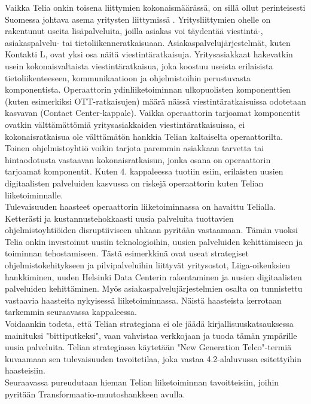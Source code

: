 \documentclass[finnish,12pt,a4paper,pdftex]{article}
\begin{document}
Vaikka Telia onkin toisena liittymien kokonaismäärässä, on sillä ollut perinteisesti Suomessa johtava asema yritysten liittymissä \citep{hesari}. Yritysliittymien ohelle on rakentunut useita lisäpalveluita, joilla asiakas voi täydentää viestintä-, asiakaspalvelu- tai tietoliikenneratkaisuaan. Asiakaspalvelujärjestelmät, kuten Kontakti L, ovat yksi osa näitä viestintäratkaisuja. Yritysasiakkaat hakevatkin usein kokonaisvaltaista viestintäratkaisua, joka koostuu useista erilaisista tietoliikenteeseen, kommunikaatioon ja ohjelmistoihin perustuvasta komponentista. Operaattorin ydinliiketoiminnan ulkopuolisten komponenttien (kuten esimerkiksi OTT-ratkaisujen) määrä näissä viestintäratkaisuissa odotetaan kasvavan (Contact Center-kappale). Vaikka operaattorin tarjoamat komponentit ovatkin välttämättömiä yritysasiakkaiden viestintäratkaisuissa, ei kokonaisratkaisua ole välttämätön hankkia Telian kaltaiselta operaattorilta. Toinen ohjelmistoyhtiö voikin tarjota paremmin asiakkaan tarvetta tai hintaodotusta vastaavan kokonaisratkaisun, jonka osana on operaattorin tarjoamat komponentit. Kuten 4. kappaleessa tuotiin esiin, erilaisten uusien digitaalisten palveluiden kasvussa on riskejä operaattorin kuten Telian liiketoiminnalle.\\

Tulevaisuuden haasteet operaattorin liiketoiminnassa on havaittu Telialla. Ketterästi ja kustannustehokkaasti uusia palveluita tuottavien ohjelmistoyhtiöiden disruptiiviseen uhkaan pyritään vastaamaan.
Tämän vuoksi Telia onkin investoinut uusiin teknologioihin, uusien palveluiden kehittämiseen ja toiminnan tehostamiseen. Tästä esimerkkinä ovat useat strategiset ohjelmistokehitykseen ja pilvipalveluihin liittyvät yritysostot, Liiga-oikeuksien hankkiminen, uuden Helsinki Data Centerin rakentaminen ja uusien digitaalisten palveluiden kehittäminen. Myös asiakaspalvelujärjestelmien osalta on tunnistettu vastaavia haasteita nykyisessä liiketoiminnassa. Näistä haasteista kerrotaan tarkemmin seuraavassa kappaleessa.\\

Voidaankin todeta, että Telian strategiana ei ole jäädä kirjallisuuskatsauksessa mainituksi "bittiputkeksi", vaan vahvistaa verkkojaan ja tuoda tämän ympärille uusia palveluita. Telian strategiassa käytetään "New Generation Telco"-termiä kuvaamaan sen tulevaisuuden tavoitetilaa, joka vastaa 4.2-alaluvussa esitettyihin haasteisiin.\\

Seuraavassa pureudutaan hieman Telian liiketoiminnan tavoitteisiin, joihin pyritään Transformaatio-muutoshankkeen avulla.
\end{document}
